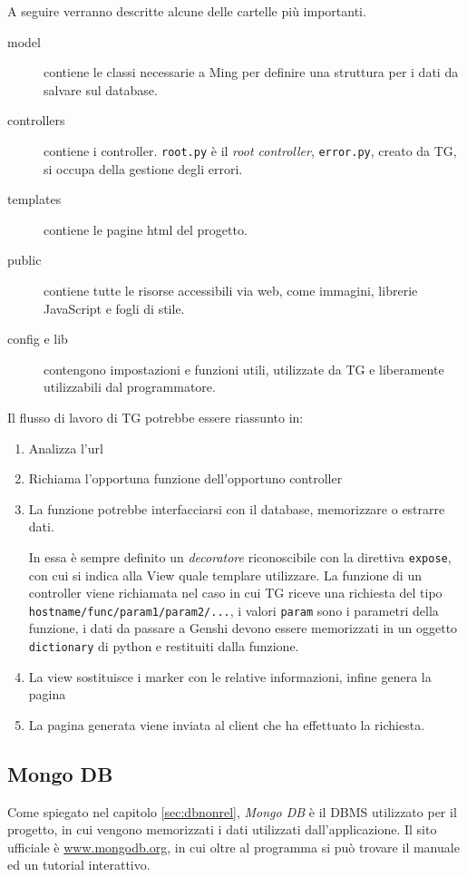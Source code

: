 A seguire verranno descritte alcune delle cartelle più importanti.
\begin{description}
\item[model] contiene le classi necessarie a Ming per definire una struttura per i dati da salvare sul database.
\item[controllers] contiene i controller. \texttt{root.py} è il \emph{root controller}, \texttt{error.py}, creato da TG, si occupa della gestione degli errori.
\item[templates] contiene le pagine html del progetto.
\item[public] contiene tutte le risorse accessibili via web, come immagini, librerie JavaScript e fogli di stile.
\item[config e lib] contengono impostazioni e funzioni utili, utilizzate da TG e liberamente utilizzabili dal programmatore.
\end{description}

Il flusso di lavoro di TG potrebbe essere riassunto in:
\begin{enumerate}
\item Analizza l'url
\item Richiama l'opportuna funzione dell'opportuno controller
\item La funzione potrebbe interfacciarsi con il database, memorizzare o estrarre dati. 

In essa è sempre definito un \emph{decoratore} riconoscibile con la direttiva \texttt{expose}, con cui si indica alla View quale templare utilizzare. La funzione di un controller viene richiamata nel caso in cui TG riceve una richiesta del tipo \texttt{hostname/func/param1/param2/...}, i valori \texttt{param} sono i parametri della funzione, i dati da passare a Genshi devono essere memorizzati in un oggetto \texttt{dictionary} di python e restituiti dalla funzione. 
\item La view sostituisce i marker con le relative informazioni, infine genera la pagina
\item La pagina generata viene inviata al client che ha effettuato la richiesta.
\end{enumerate}

		
\subsection{Mongo DB}\label{sec:mongo}
Come spiegato nel capitolo \ref{sec:dbnonrel}, \emph{Mongo DB} è il DBMS utilizzato per il progetto, in cui vengono memorizzati i dati utilizzati dall'applicazione. Il sito ufficiale è \url{www.mongodb.org}, in cui oltre al programma si può trovare il manuale ed un tutorial interattivo. 

